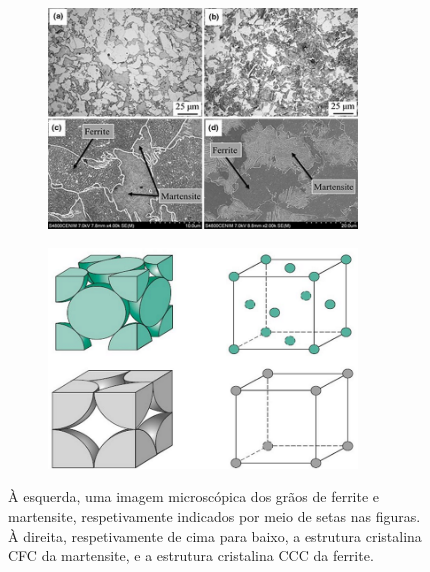 \begin{figure}[htb]
    \centering
    \begin{subfigure}{.5\textwidth}
      \centering
      \includegraphics[width = 0.9\textwidth]{Figures/Cap2/Ferrite_Martensite.png}
      \caption{}
      \label{fig:Crystal}
    \end{subfigure}%
    \begin{subfigure}{.5\textwidth}
      \centering
      \includegraphics[width = 0.9\textwidth]{Figures/Cap2/CFC_CS.png}
      \caption{}
      \label{fig:CFC_CS}
    \end{subfigure}
\caption[Diferenças entre microestruturas de martensite e ferrite]%
{À esquerda, uma imagem microscópica dos grãos de ferrite e martensite, respetivamente indicados por meio de setas nas figuras. À direita, respetivamente de cima para baixo, a estrutura cristalina CFC da martensite, e a estrutura cristalina CCC da ferrite.}
\end{figure}
